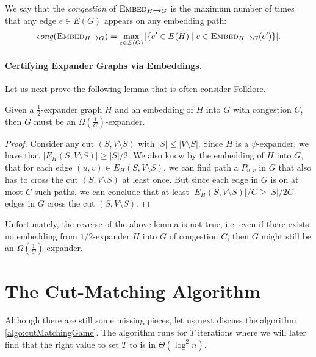 We say that the \emph{congestion} of $\textsc{Embed}_{H \xrightarrow{} G}$ is the maximum number of times that any edge $e \in E(G)$ appears on any embedding path: \[
\mathit{cong}(\textsc{Embed}_{H \xrightarrow{} G}) = \max_{e \in E(G)} |\{ e' \in E(H) \;|\; e \in \textsc{Embed}_{H \xrightarrow{} G}(e') \}|.
\]

\paragraph{Certifying Expander Graphs via Embeddings.} Let us next prove the following lemma that is often consider Folklore.

\begin{lemma}\label{lma:folklore_embedding}
Given a $\frac{1}{2}$-expander graph $H$ and an embedding of $H$ into $G$ with congestion $C$, then $G$ must be an $\Omega\left(\frac{1}{C}\right)$-expander. 
\end{lemma}
\begin{proof}
Consider any cut $(S, V \setminus S)$ with $|S| \leq |V \setminus S|$. Since $H$ is a $\psi$-expander, we have that $|E_H(S, V \setminus S)| \geq |S|/2$. We also know by the embedding of $H$ into $G$, that for each edge $(u,v) \in E_H(S, V \setminus S)$, we can find path a $P_{u,v}$ in $G$ that also has to cross the cut $(S, V \setminus S)$ at least once. But since each edge in $G$ is on at most $C$ such paths, we can conclude that at least $|E_H(S, V \setminus S)|/ C \geq |S|/2C$ edges in $G$ cross the cut $(S, V \setminus S)$. 
\end{proof}
 
Unfortunately, the reverse of the above lemma is not true, i.e. even if there exists no embedding from $1/2$-expander $H$ into $G$ of congestion $C$, then $G$ might still be an $\Omega\left(\frac{1}{C}\right)$-expander. 

\section{The Cut-Matching Algorithm}

Although there are still some missing pieces, let us next discuss the algorithm   \ref{algo:cutMatchingGame}. The algorithm runs for $T$ iterations where we will later find that the right value to set $T$ to is in $\Theta(\log^2 n)$. 

